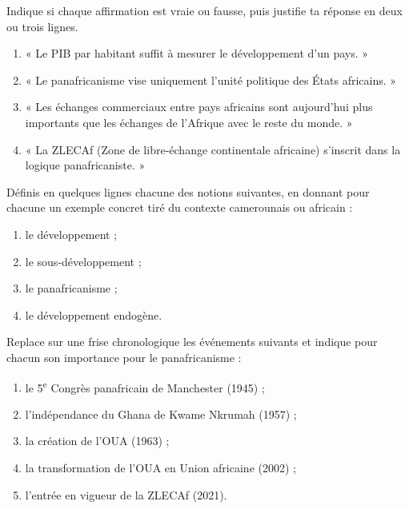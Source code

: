 \documentclass[11pt]{article}
\newcounter{popsec}
\newcounter{popsub}
\newcommand{\courssub}[1]{%
  \stepcounter{popsub}%
  \par\vspace{9pt}\noindent{\popxbold\fontsize{11.5}{13}\selectfont\color{popink}{\color{poporange}\thepopsec.\thepopsub}\hspace{6pt}#1}\par\nopagebreak\vspace{4pt}
}
\begin{document}
\begin{exercice}
Indique si chaque affirmation est vraie ou fausse, puis justifie ta réponse en deux ou trois lignes.
\begin{enumerate}
\item « Le PIB par habitant suffit à mesurer le développement d'un pays. »
\item « Le panafricanisme vise uniquement l'unité politique des États africains. »
\item « Les échanges commerciaux entre pays africains sont aujourd'hui plus importants que les échanges de l'Afrique avec le reste du monde. »
\item « La ZLECAf (Zone de libre-échange continentale africaine) s'inscrit dans la logique panafricaniste. »
\end{enumerate}
\end{exercice}

\begin{exercice}[Définitions]
Définis en quelques lignes chacune des notions suivantes, en donnant pour chacune un exemple concret tiré du contexte camerounais ou africain :
\begin{enumerate}
\item le développement ;
\item le sous-développement ;
\item le panafricanisme ;
\item le développement endogène.
\end{enumerate}
\end{exercice}

\begin{exercice}
Replace sur une frise chronologique les événements suivants et indique pour chacun son importance pour le panafricanisme :
\begin{enumerate}
\item le 5\textsuperscript{e} Congrès panafricain de Manchester (1945) ;
\item l'indépendance du Ghana de Kwame Nkrumah (1957) ;
\item la création de l'OUA (1963) ;
\item la transformation de l'OUA en Union africaine (2002) ;
\item l'entrée en vigueur de la ZLECAf (2021).
\end{enumerate}
\end{exercice}

\courssub{Je m'entraîne}
\end{document}
